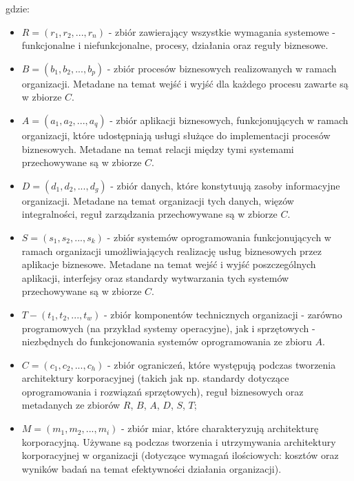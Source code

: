 gdzie:
\begin{itemize}
\item{$R = (r_{1}, r_{2},..., r_{n})$ - zbiór zawierający wszystkie wymagania systemowe - funkcjonalne i niefunkcjonalne, procesy, działania oraz reguły biznesowe.}
\item{$B = (b_{1}, b_{2},..., b_{p})$ - zbiór procesów biznesowych realizowanych w ramach organizacji. Metadane na temat wejść i wyjść dla każdego procesu zawarte są w zbiorze $C$.}
\item{$A = (a_{1}, a_{2},..., a_{q})$ - zbiór aplikacji biznesowych, funkcjonujących w ramach organizacji, które udostępniają usługi służące do implementacji procesów biznesowych. Metadane na temat relacji między tymi systemami przechowywane są w zbiorze $C$.}
\item{$D = (d_{1}, d_{2},..., d_{g})$ - zbiór danych, które konstytuują zasoby informacyjne organizacji. Metadane na temat organizacji tych danych, więzów integralności, reguł zarządzania przechowywane są w zbiorze $C$.}
\item{$S = (s_{1}, s_{2},..., s_{k})$ - zbiór systemów oprogramowania funkcjonujących w ramach organizacji umożliwiających realizację usług biznesowych przez aplikacje biznesowe. Metadane na temat wejść i wyjść poszczególnych aplikacji, interfejsy oraz standardy wytwarzania tych systemów przechowywane są w zbiorze $C$.}
\item{$T - (t_{1}, t_{2},..., t_{w})$ - zbiór komponentów technicznych organizacji - zarówno programowych (na przykład systemy operacyjne), jak i sprzętowych - niezbędnych do funkcjonowania systemów oprogramowania ze zbioru $A$.}
\item{$C = (c_{1}, c_{2},..., c_{h})$ - zbiór ograniczeń, które występują podczas tworzenia architektury korporacyjnej (takich jak np. standardy dotyczące oprogramowania i rozwiązań sprzętowych), reguł biznesowych oraz metadanych ze zbiorów $R$, $B$, $A$, $D$, $S$, $T$;}
\item{$M = (m_{1}, m_{2},..., m_{i})$ - zbiór miar, które charakteryzują architekturę korporacyjną. Używane są podczas tworzenia i utrzymywania architektury korporacyjnej w organizacji (dotyczące wymagań ilościowych: kosztów oraz wyników badań na temat efektywności działania organizacji).}
\end{itemize}


